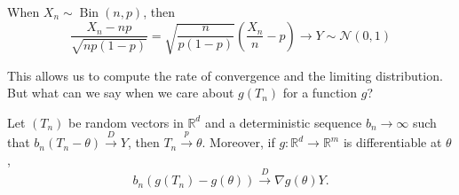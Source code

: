 \begin{eg}
	When \(X_n \sim \operatorname{Bin}(n, p) \), then
	\[
		\frac{X_n - n p}{\sqrt{n p (1 - p)} }
		= \sqrt{\frac{n}{p (1 - p)}} \left( \frac{X_n}{n} - p \right)
		\to Y \sim \mathcal{N} (0, 1)
	\]
\end{eg}

This allows us to compute the rate of convergence and the limiting distribution. But what can we say when we care about \(g(T_n)\) for a function \(g\)?

\begin{theorem}\label{thm:delta-method}
	Let \((T_n)\) be random vectors in \(\mathbb{R} ^d\) and a deterministic sequence \(b_n \to \infty \) such that \(b_n (T_n - \theta ) \overset{D}{\to } Y\), then \(T_n \overset{p}{\to } \theta \). Moreover, if \(g \colon \mathbb{R} ^d \to \mathbb{R} ^m\) is differentiable at \(\theta \),
	\[
		b_n (g(T_n) - g(\theta )) \overset{D}{\to } \nabla g(\theta ) Y.
	\]
\end{theorem}

